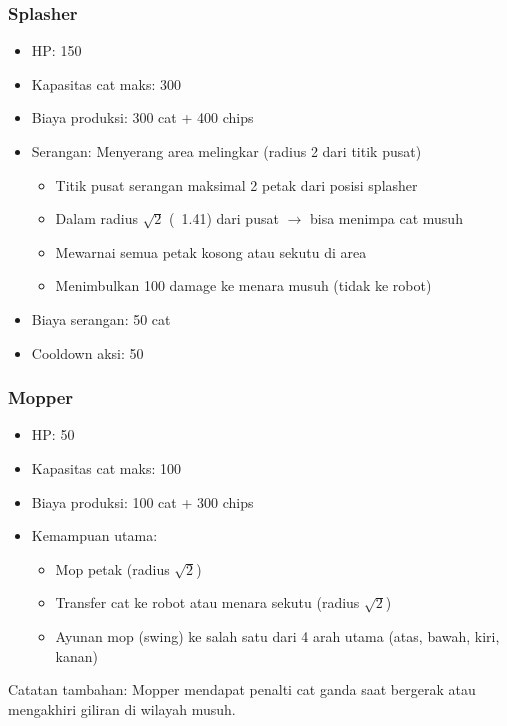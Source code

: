 \subsubsection{Splasher}
\begin{itemize}
    \item HP: 150
    \item Kapasitas cat maks: 300
    \item Biaya produksi: 300 cat + 400 chips
    \item Serangan: Menyerang area melingkar (radius 2 dari titik pusat)
          \begin{itemize}
              \item Titik pusat serangan maksimal 2 petak dari posisi splasher
              \item Dalam radius $\sqrt{2}$ (~1.41) dari pusat $\rightarrow$ bisa menimpa cat musuh
              \item Mewarnai semua petak kosong atau sekutu di area
              \item Menimbulkan 100 damage ke menara musuh (tidak ke robot)
          \end{itemize}
    \item Biaya serangan: 50 cat
    \item Cooldown aksi: 50
\end{itemize}

\subsubsection{Mopper}
\begin{itemize}
    \item HP: 50
    \item Kapasitas cat maks: 100
    \item Biaya produksi: 100 cat + 300 chips
    \item Kemampuan utama:
          \begin{itemize}
              \item Mop petak (radius $\sqrt{2}$)
              \item Transfer cat ke robot atau menara sekutu (radius $\sqrt{2}$)
              \item Ayunan mop (swing) ke salah satu dari 4 arah utama (atas, bawah, kiri, kanan)
          \end{itemize}
\end{itemize}
Catatan tambahan: Mopper mendapat penalti cat ganda saat bergerak atau mengakhiri giliran di wilayah musuh.

